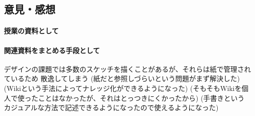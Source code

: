 

\subsection{意見・感想}

\paragraph*{授業の資料として}
\paragraph*{関連資料をまとめる手段として}
デザインの課題では多数のスケッチを描くことがあるが、それらは紙で管理されているため
散逸してしまう
(紙だと参照しづらいという問題がまず解決した)
(Wikiという手法によってナレッジ化ができるようになった)
    (そもそもWikiを個人で使ったことはなかったが、それはとっつきにくかったから)
    (手書きというカジュアルな方法で記述できるようになったので使えるようになった)

